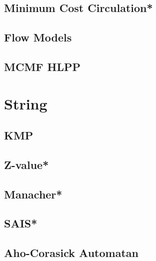 \subsection{Minimum Cost Circulation*} %

\subsection{Flow Models}

% 
\subsection{MCMF HLPP}



\section{String}
\subsection{KMP}

\subsection{Z-value*} %

\subsection{Manacher*} %

%
\subsection{SAIS*} %

\subsection{Aho-Corasick Automatan}

%
